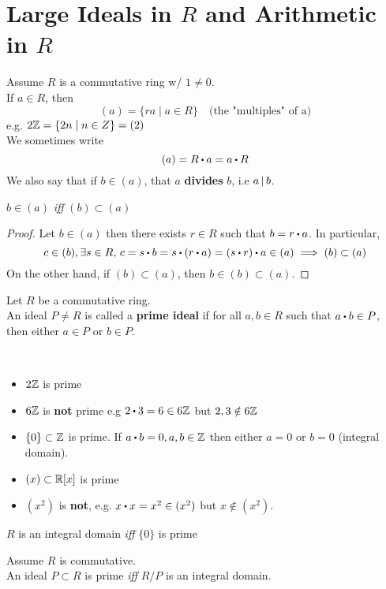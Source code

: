 \documentclass[../Main.tex]{subfiles}
\begin{document}
\section*{Large Ideals in \texorpdfstring{$R$}{TEXT} and Arithmetic in \texorpdfstring{$R$}{TEXT}}
Assume $R$ is a commutative ring w/ $1\ne 0$. \\
If $a\in R$, then
\[(a)=\{ra\mid a\in R\} \quad \text{(the "multiples" of a)}\]
e.g. $2\mathbb{Z}=\{2n\mid n\in Z\}=(2)$\\
\Note We sometimes write
\[(a)=R\rdot a=a\rdot R\]
We also say that if $b\in (a)$, that $a$ \textbf{divides} $b$, i.e $a \, | \, b$.
\begin{claim}
	$b\in (a)$ \textit{iff} $(b) \subset (a)$
\end{claim}
\begin{proof}
	Let $b\in (a)$ then there exists $r\in R$ such that $b=r\rdot a$. In particular,
	\[c\in (b), \exists s\in R, \, c=s\rdot b=s\rdot (r\rdot a)=(s\rdot r)\rdot a\in (a)\implies (b) \subset (a)\]
	On the other hand, if $(b)\subset (a)$, then $b\in (b) \subset (a)$.
\end{proof}
\begin{dfn}[title = Prime Ideal]
	Let $R$ be a commutative ring.\\
	An ideal $P\ne R$ is called a \textbf{prime ideal} if for all $a,b\in R$ such that $a\rdot b\in P$, then either $a\in P$ or $b\in P$.
\end{dfn}
\newpage
\begin{example}~
\begin{itemize}
	\item$2\mathbb{Z}$ is prime
	\item$6\mathbb{Z}$ is \textbf{not} prime e.g $2\rdot 3 = 6 \in 6\Z$ but $2,3\notin 6\mathbb{Z}$
	\item $\{0\} \subset \mathbb{Z}$ is prime. If $a\rdot b=0, a,b \in \Z$ then either $a=0$ or $b=0$ (integral domain).
	\item $(x)\subset \mathbb{R}[x]$ is prime
	\item $(x^2)$ is \textbf{not}, e.g. $x\rdot x=x^2\in (x^2)$ but $x\notin (x^2)$.
\end{itemize}
\end{example}
\begin{prop}[title = \texorpdfstring{$R$}{R} integral if \texorpdfstring{$\{0\}$}{\{0\}} prime]
	$R$ is an integral domain \textit{iff} $\{0\}$ is prime
\end{prop}
\begin{thm}[title = Prime Ideal \texorpdfstring{$\Longleftrightarrow R/P$}{R/P} integral domain]
	Assume $R$ is commutative.\\
	An ideal $P\subset R$ is prime \textit{iff} $R/P$ is an integral domain.
\end{thm}
\end{document}
